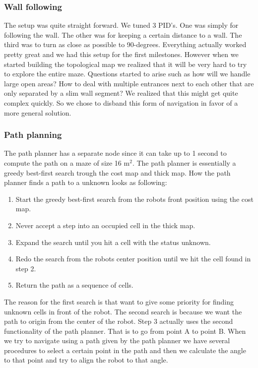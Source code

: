 \subsubsection{Wall following}
The setup was quite straight forward. We tuned 3 PID’s. One was simply for following the wall. The other was for keeping a certain distance to a wall. The third was to turn as close as possible to 90-degrees. Everything actually worked pretty great and we had this setup for the first milestones. However when we started building the topological map we realized that it will be very hard to try to explore the entire maze. Questions started to arise such as how will we handle large open areas? How to deal with multiple entrances next to each other that are only separated by a slim wall segment? We realized that this might get quite complex quickly. So we chose to disband this form of navigation in favor of a more general solution.

\subsubsection{Path planning}
The path planner has a separate node since it can take up to 1 second to compute the path on a maze of size 16 $\text{m}^2$. The path planner is essentially a greedy best-first search trough the cost map and thick map. How the path planner finds a path to a unknown looks as following:

\begin{enumerate}
\item Start the greedy best-first search from the robots front position using the cost map.
\item Never accept a step into an occupied cell in the thick map.
\item Expand the search until you hit a cell with the status unknown.
\item Redo the search from the robots center position until we hit the cell found in step 2.
\item Return the path as a sequence of cells.
\end{enumerate}

The reason for the first search is that want to give some priority for finding unknown cells in front of the robot. The second search is because we want the path to origin from the center of the robot. Step 3 actually uses the second functionality of the path planner. That is to go from point A to point B. When we try to navigate using a path given by the path planner we have several procedures to select a certain point in the path and then we calculate the angle to that point and try to align the robot to that angle.

